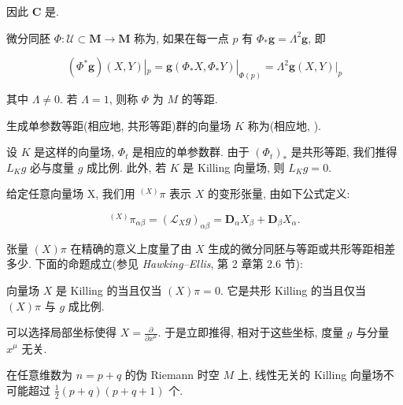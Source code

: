 因此 $\mathbf{C}$ 是.


\begin{definition*}
微分同胚 $\Phi : \mathcal{U} \subset \mathbf{M} \to \mathbf{M}$ 称为, 如果在每一点 $p$ 有 $\Phi_{*}\mathbf{g} = \Lambda^{2}\mathbf{g}$, 即

\[
(\Phi^{*}\mathbf{g})(X, Y)|_{p} = \mathbf{g}(\Phi_{*}X, \Phi_{*}Y)|_{\Phi(p)} = \Lambda^{2}\mathbf{g}(X, Y)|_{p}
\]

其中 $\Lambda\neq 0$. 若 $\Lambda = 1$, 则称 $\Phi$ 为 $M$ 的等距.
\end{definition*}

\begin{definition*}
生成单参数等距(相应地, 共形等距)群的向量场 $K$ 称为(相应地, ).
\end{definition*}

设 $K$ 是这样的向量场, $\Phi_{t}$ 是相应的单参数群. 由于 $(\Phi_{t})_{*}$ 是共形等距, 我们推得 $L_{K}g$ 必与度量 $g$ 成比例. 此外, 若 $K$ 是 Killing 向量场, 则 $L_{K}g = 0$.

\begin{definition*}
给定任意向量场 X, 我们用 $^{(X)}\pi$ 表示 $X$ 的变形张量, 由如下公式定义:

\[
{}^{(X)}\pi_{\alpha\beta} = (\mathcal{L}_{X}g)_{\alpha\beta} = \mathbf{D}_{\alpha}X_{\beta} + \mathbf{D}_{\beta}X_{\alpha}.
\]
\end{definition*}

张量 $(X)\pi$ 在精确的意义上度量了由 $X$ 生成的微分同胚与等距或共形等距相差多少. 下面的命题成立(参见 \emph{Hawking--Ellis}, 第 2 章第 2.6 节):

\begin{proposition}\label{prop:cA-3.3}
向量场 $X$ 是 Killing 的当且仅当 $(X)\pi = 0$. 它是共形 Killing 的当且仅当 $(X)\pi$ 与 $g$ 成比例.
\end{proposition}

\begin{remark*}
可以选择局部坐标使得 $X = \frac{\partial}{\partial x^{\mu}}$. 于是立即推得, 相对于这些坐标, 度量 $g$ 与分量 $x^{\mu}$ 无关.
\end{remark*}

\begin{proposition}\label{prop:cA-3.4}
在任意维数为 $n = p + q$ 的伪 Riemann 时空 $M$ 上, 线性无关的 Killing 向量场不可能超过 $\frac{1}{2}(p + q)(p + q + 1)$ 个.
\end{proposition}

